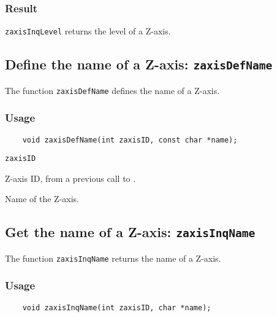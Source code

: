 \subsubsection*{Result}

{\tt zaxisInqLevel} returns the level of a Z-axis.


\subsection{Define the name of a Z-axis: {\tt zaxisDefName}}
\label{zaxisDefName}

The function {\tt zaxisDefName} defines the name of a Z-axis.

\subsubsection*{Usage}

\begin{verbatim}
    void zaxisDefName(int zaxisID, const char *name);
\end{verbatim}

\hspace*{4mm}\begin{minipage}[]{15cm}
\begin{deflist}{\tt zaxisID\ }
\item[{\tt zaxisID}]
Z-axis ID, from a previous call to {}.
\item[{\tt name}]
Name of the Z-axis.

\end{deflist}
\end{minipage}


\subsection{Get the name of a Z-axis: {\tt zaxisInqName}}
\label{zaxisInqName}

The function {\tt zaxisInqName} returns the name of a Z-axis.

\subsubsection*{Usage}

\begin{verbatim}
    void zaxisInqName(int zaxisID, char *name);
\end{verbatim}

